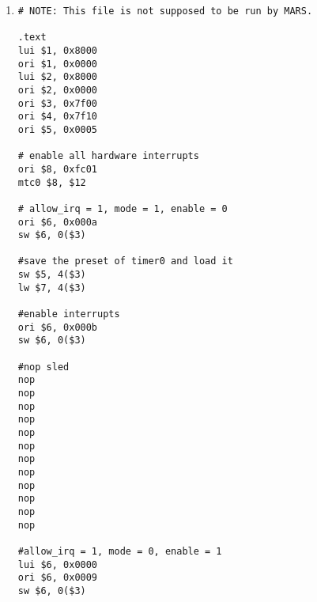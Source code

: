 \documentclass[12pt,AutoFakeBold,AutoFakeSlant]{article}
\begin{document}
\begin{enumerate}
\begin{lstlisting}[language={[mips]Assembler}]
addu $3, $1, $2

mult $1, $2

# exception at level M
sw $0, 1($0)

# STORE_Ms at level D and E
mthi $1
mthi $2

# flush pipeline and wait for the mult to complete
nop
nop
nop
nop
nop
nop
nop

# exception at level M
sw $0, 1($0)

mthi $0

mfhi $9
mflo $10

# flush pipeline
nop
nop
nop
nop
nop

lui $1, 0x8000

mult $1, $1

# exception at level M
add $1, $1, $1

mfhi $9
mflo $10

loop:
beq $0, $0, loop
nop

.ktext 0x4180
mfc0 $4, $14
addiu $4, $4, 4
mtc0 $4, $14
eret

\end{lstlisting}
\begin{verbatim}
@00003000: $ 1 <= cafe0000
@00003004: $ 1 <= cafebabe
@00003008: $ 2 <= 00c00000
@0000300c: $ 2 <= 00c0ffee
@00003010: $ 3 <= cbbfbaac
@00004180: $ 4 <= 00003018
@00004184: $ 4 <= 0000301c
@00004180: $ 4 <= 00003040
@00004184: $ 4 <= 00003044
@00003048: $ 9 <= 00000000
@0000304c: $10 <= 8354dea4
@00003064: $ 1 <= 80000000
@00004180: $ 4 <= 0000306c
@00004184: $ 4 <= 00003070
@00003070: $ 9 <= 40000000
@00003074: $10 <= 00000000
\end{verbatim}
\item
\begin{lstlisting}[language={[mips]Assembler}]
# NOTE: This file is not supposed to be run by MARS. 

.text
lui $1, 0x8000
ori $1, 0x0000
lui $2, 0x8000
ori $2, 0x0000
ori $3, 0x7f00
ori $4, 0x7f10
ori $5, 0x0005

# enable all hardware interrupts
ori $8, 0xfc01
mtc0 $8, $12

# allow_irq = 1, mode = 1, enable = 0
ori $6, 0x000a
sw $6, 0($3)

#save the preset of timer0 and load it
sw $5, 4($3)
lw $7, 4($3)

#enable interrupts
ori $6, 0x000b
sw $6, 0($3)

#nop sled
nop
nop
nop
nop
nop
nop
nop
nop
nop
nop
nop
nop

#allow_irq = 1, mode = 0, enable = 1
lui $6, 0x0000
ori $6, 0x0009
sw $6, 0($3)


\end{lstlisting}
\end{enumerate}
\end{document}
